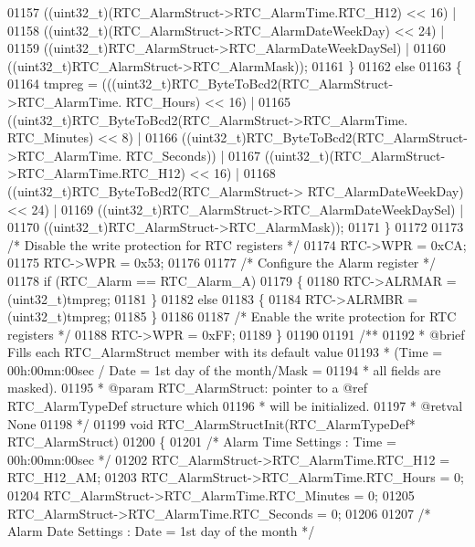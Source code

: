 \begin{DoxyCode}
01157               ((uint32\_t)(RTC\_AlarmStruct->RTC_AlarmTime.RTC_H12) << 16) |
01158               ((uint32\_t)(RTC\_AlarmStruct->RTC_AlarmDateWeekDay) << 24) |
01159               ((uint32\_t)RTC\_AlarmStruct->RTC_AlarmDateWeekDaySel) |
01160               ((uint32\_t)RTC\_AlarmStruct->RTC_AlarmMask));
01161   \}
01162   \textcolor{keywordflow}{else}
01163   \{
01164     tmpreg = (((uint32\_t)RTC_ByteToBcd2(RTC\_AlarmStruct->RTC_AlarmTime.
      RTC_Hours) << 16) |
01165               ((uint32\_t)RTC_ByteToBcd2(RTC\_AlarmStruct->RTC_AlarmTime.
      RTC_Minutes) << 8) |
01166               ((uint32\_t)RTC_ByteToBcd2(RTC\_AlarmStruct->RTC_AlarmTime.
      RTC_Seconds)) |
01167               ((uint32\_t)(RTC\_AlarmStruct->RTC_AlarmTime.RTC_H12) << 16) |
01168               ((uint32\_t)RTC_ByteToBcd2(RTC\_AlarmStruct->
      RTC_AlarmDateWeekDay) << 24) |
01169               ((uint32\_t)RTC\_AlarmStruct->RTC_AlarmDateWeekDaySel) |
01170               ((uint32\_t)RTC\_AlarmStruct->RTC_AlarmMask));
01171   \}
01172 
01173   \textcolor{comment}{/* Disable the write protection for RTC registers */}
01174   RTC->WPR = 0xCA;
01175   RTC->WPR = 0x53;
01176 
01177   \textcolor{comment}{/* Configure the Alarm register */}
01178   \textcolor{keywordflow}{if} (RTC\_Alarm == RTC_Alarm_A)
01179   \{
01180     RTC->ALRMAR = (uint32\_t)tmpreg;
01181   \}
01182   \textcolor{keywordflow}{else}
01183   \{
01184     RTC->ALRMBR = (uint32\_t)tmpreg;
01185   \}
01186 
01187   \textcolor{comment}{/* Enable the write protection for RTC registers */}
01188   RTC->WPR = 0xFF;
01189 \}
01190 
01191 \textcolor{comment}{/**}
01192 \textcolor{comment}{  * @brief  Fills each RTC\_AlarmStruct member with its default value}
01193 \textcolor{comment}{  *         (Time = 00h:00mn:00sec / Date = 1st day of the month/Mask =}
01194 \textcolor{comment}{  *         all fields are masked).}
01195 \textcolor{comment}{  * @param  RTC\_AlarmStruct: pointer to a @ref RTC\_AlarmTypeDef structure which}
01196 \textcolor{comment}{  *         will be initialized.}
01197 \textcolor{comment}{  * @retval None}
01198 \textcolor{comment}{  */}
01199 \textcolor{keywordtype}{void} RTC_AlarmStructInit(RTC\_AlarmTypeDef* RTC\_AlarmStruct)
01200 \{
01201   \textcolor{comment}{/* Alarm Time Settings : Time = 00h:00mn:00sec */}
01202   RTC\_AlarmStruct->RTC_AlarmTime.RTC_H12 = RTC_H12_AM;
01203   RTC\_AlarmStruct->RTC_AlarmTime.RTC_Hours = 0;
01204   RTC\_AlarmStruct->RTC_AlarmTime.RTC_Minutes = 0;
01205   RTC\_AlarmStruct->RTC_AlarmTime.RTC_Seconds = 0;
01206 
01207   \textcolor{comment}{/* Alarm Date Settings : Date = 1st day of the month */}

\end{DoxyCode}
